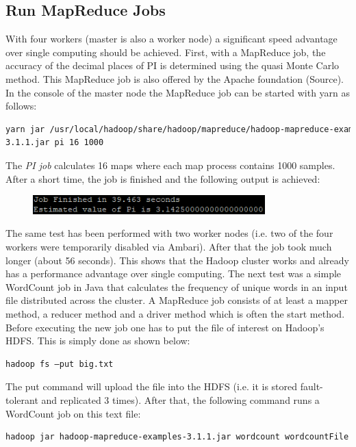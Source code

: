 \documentclass[12pt]{article}
\begin{document}
\subsection{Run MapReduce Jobs}
With four workers (master is also a worker node) a significant speed advantage over single computing should be achieved. First, with a MapReduce job, the accuracy of the decimal places of PI is determined using the quasi Monte Carlo method. This MapReduce job is also offered by the Apache foundation (Source). In the console of the master node the MapReduce job can be started with \acs{yarn} as
follows:
\begin{lstlisting}[language=bash,breaklines=true]
yarn jar /usr/local/hadoop/share/hadoop/mapreduce/hadoop-mapreduce-examples-
3.1.1.jar pi 16 1000
\end{lstlisting}
The \emph{PI job} calculates 16 maps where each map process contains 1000 samples. After a short time, the job is finished and the following output is achieved:
\begin{figure}[H]
\hspace{1.2cm}
\includegraphics[width=0.8\textwidth]{img/job}
\label{pic:job}
\end{figure}
\noindent The same test has been performed with two worker nodes (i.e. two of the four workers were temporarily disabled via Ambari). After that the job took much longer (about 56 seconds). This shows that the Hadoop cluster works and already has a performance advantage over single computing. The next test was a simple WordCount job in Java that calculates the frequency of unique words in an input file distributed across the cluster. A MapReduce job consists of at least a mapper method, a reducer method and a driver method which is often the start method. Before executing the new job one has to put the file of interest on Hadoop’s HDFS. This is simply done as shown below:
\begin{lstlisting}[language=bash,breaklines=true]
hadoop fs –put big.txt
\end{lstlisting}
The put command will upload the file into the HDFS (i.e. it is stored fault-tolerant and replicated 3 times). After that, the following command runs a WordCount job on this text file:
\begin{lstlisting}[language=bash,breaklines=true]
hadoop jar hadoop-mapreduce-examples-3.1.1.jar wordcount wordcountFile big.txt
\end{lstlisting}
\end{document}
